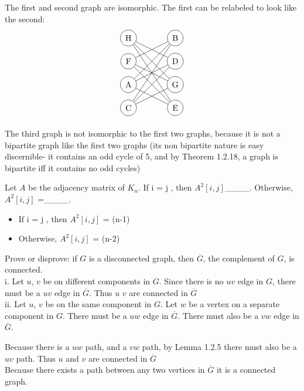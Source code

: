 \documentclass[12pt]{article}
\newenvironment{question}[2][Question]{\begin{trivlist}
\item[\hskip \labelsep {\bfseries #1}\hskip \labelsep {\bfseries #2.}]}{\end{trivlist}}
\begin{document}
	The first and second graph are isomorphic. The first can be relabeled to look like the second:
		\begin{align*}
	\begin{tikzpicture}
	\node[shape=circle,draw=black] (C) at (0,0) {C};
	\node[shape=circle,draw=black] (A) at (0,1) {A};
	\node[shape=circle,draw=black] (F) at (0,2) {F};
	\node[shape=circle,draw=black] (H) at (0,3) {H};
	\node[shape=circle,draw=black] (E) at (2,0) {E};
	\node[shape=circle,draw=black] (G) at (2,1) {G};
	\node[shape=circle,draw=black] (D) at (2,2) {D};
	\node[shape=circle,draw=black] (B) at (2,3) {B};
	\path [] (D) edge node[left] {} (A);
	\path [] (A) edge node[left] {} (B);
	\path [] (B) edge node[left] {} (C);
	\path [] (C) edge node[left] {} (D);
	\path [] (E) edge node[left] {} (F);
	\path [] (F) edge node[left] {} (G);
	\path [] (G) edge node[left] {} (H);
	\path [] (H) edge node[left] {} (E);
	\path [] (A) edge node[left] {} (E);
	\path [] (B) edge node[left] {} (F);
	\path [] (G) edge node[left] {} (C);
	\path [] (D) edge node[left] {} (H);
	\end{tikzpicture}
	\end{align*}
	
	The third graph is not isomorphic to the first two graphs, because it is not a bipartite graph like the first two graphs (its non bipartite nature is easy discernible- it contains an odd cycle of 5, and by Theorem 1.2.18, a graph is bipartite iff it contains no odd cycles) 
	
\begin{question}{4} 
	Let $A$ be the adjacency matrix of  $K_n$. If i = j , then $A^{2}[i,j]$\_\_\_\_.  Otherwise, $A^{2}[i,j]$ =\_\_\_\_. 
\end{question}

\begin{itemize}
	\item If i = j , then $A^{2}[i,j]$ = (n-1)
	\item Otherwise,   $A^{2}[i,j]$ = (n-2)
\end{itemize}

\begin{question}{5}
	Prove or disprove: if $G$ is a disconnected graph, then $\overline{G}$, the complement of $G$, is connected.\\	
	
	i. Let $u$, $v$ be on different components in $G$. Since there is no $uv$ edge in $G$, there must be a $uv$ edge in $\overline{G}$. Thus $u$ $v$ are connected in $\overline{G}$\\
		
	ii. Let $u$, $v$ be on the same component in $G$. Let $w$ be a vertex on a separate component in $G$. There must be a $uw$ edge in $\overline{G}$. There must also be a $vw$ edge in $\overline{G}$. 

	Because there is a $uw$ path, and a $vw$ path, by Lemma 1.2.5 there must also be a $uv$ path. Thus $u$ and $v$ are connected in $\overline{G}$\\

	Because there exists a path between any two vertices in $\overline{G}$ it is a connected graph.
\end{question}
\end{document}
